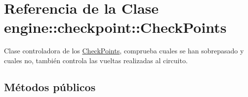 \hypertarget{classengine_1_1checkpoint_1_1CheckPoints}{
\section{\-Referencia de la \-Clase engine\-:\-:checkpoint\-:\-:\-Check\-Points}
\label{classengine_1_1checkpoint_1_1CheckPoints}
}


\-Clase controladora de los \hyperlink{classengine_1_1checkpoint_1_1CheckPoints}{\-Check\-Points}, comprueba cuales se han sobrepasado y cuales no, también controla las vueltas realizadas al circuito.  


\subsection*{\-Métodos públicos}
